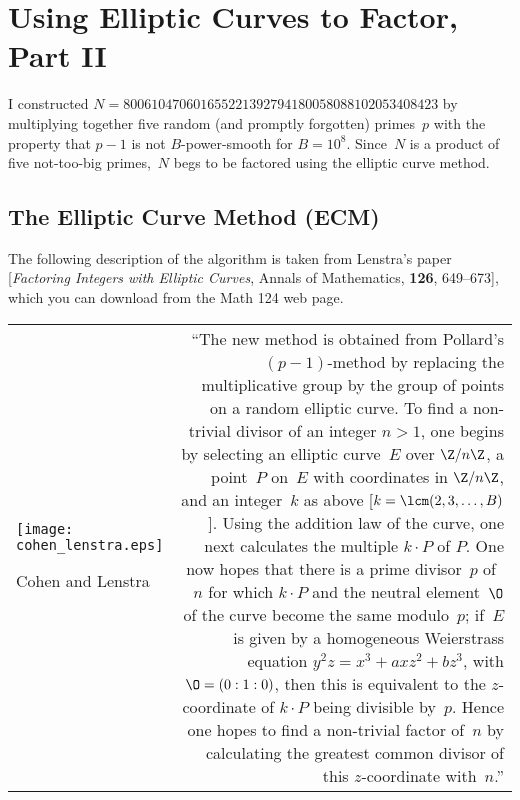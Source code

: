 \documentclass[11pt]{report}
\begin{document}
\chapter{Using Elliptic Curves to Factor, Part II}

I constructed
$
  N = 800610470601655221392794180058088102053408423
$
by multiplying together five random (and promptly
forgotten) primes~$p$ with the property that $p-1$ is not
$B$-power-smooth for $B=10^8$.  Since~$N$ is a product of five
not-too-big primes,~$N$ begs to be factored using the elliptic
curve method.

\section{The Elliptic Curve Method (ECM)}
The following description of the algorithm is taken from Lenstra's
paper [{\em Factoring Integers with Elliptic Curves}, Annals of Mathematics,
    {\bf 126}, 649--673], which you can download from the Math 124
web page.\vspace{1em}

\hspace{-4em}\noindent\begin{tabular}{lr}
  \begin{minipage}{1.5in}
    \texttt{[image: cohen\_lenstra.eps]}
    \vspace{-2em}
    \begin{center}
      \small Cohen and Lenstra
    \end{center}
    \vspace{.4in}
  \end{minipage}
   & \begin{minipage}{.77\textwidth}
       ``The new method is obtained from Pollard's $(p-1)$-method by replacing
       the multiplicative group by the group of points on a random elliptic curve.
       To find a non-trivial divisor of an integer $n>1$, one begins by
       selecting an elliptic curve~$E$ over $\Z/n\Z$, a point~$P$ on~$E$
       with coordinates in $\Z/n\Z$, and an integer~$k$ as above
         [$k=\lcm(2,3,\ldots,B)$].
       Using the addition law of the curve, one next calculates the
       multiple $k\cdot P$ of $P$.  One now hopes that there is a prime
       divisor~$p$ of~$n$ for which $k\cdot P$ and the neutral element~$\O$
       of the curve become the same modulo~$p$; if~$E$ is
       given by a homogeneous Weierstrass equation
       $y^2 z = x^3 + axz^2 + bz^3$, with $\O=(0:1:0)$, then this
       is equivalent to the $z$-coordinate of $k\cdot P$ being divisible
       by~$p$.  Hence one hopes to find a  non-trivial factor of~$n$
       by calculating the greatest common divisor of this $z$-coordinate with~$n$.''
     \end{minipage}\hspace{.1in}
  \vspace{1em}
\end{tabular}
\end{document}
